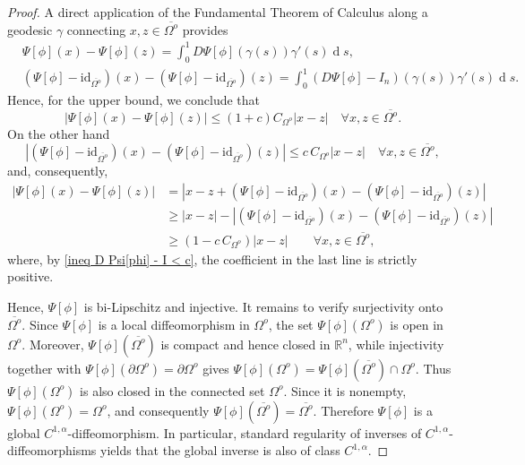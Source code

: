 \documentclass[11pt,reqno,a4paper]{amsart}
\theoremstyle{plain}
\theoremstyle{definition}
\newcommand{\R}{\mathbb{R}}
\renewcommand{\d}[1]{\ensuremath{\operatorname{d}\!{#1}}}
\begin{document}
\begin{proof}
    A direct application of the Fundamental Theorem of Calculus along a geodesic $\gamma$ connecting $x,z \in \overline{\Omega^o}$ provides
    \begin{equation*}
    \begin{aligned}
      &\Psi[\phi](x)-\Psi[\phi](z) = \int_{0}^{1} D \Psi[\phi](\gamma(s)) \gamma'(s) \d s ,
      \\
      &\left( \Psi[\phi] - \mathrm{id}_{\overline{\Omega^o}} \right)(x) - \left( \Psi[\phi] - \mathrm{id}_{\overline{\Omega^o}} \right)(z)  = \int_{0}^{1} \left( D \Psi[\phi]- I_n \right)(\gamma(s)) \gamma'(s) \d s .
    \end{aligned}
    \end{equation*}
    Hence, for the upper bound, we conclude that 
    \begin{equation*}
        |\Psi[\phi](x)-\Psi[\phi](z)|\leq (1+c) C_{\Omega^o} |x-z| \quad \forall x,z\in\overline{\Omega^o}.
    \end{equation*}
    On the other hand
    \begin{equation*}
        \left| \left( \Psi[\phi] - \mathrm{id}_{\overline{\Omega^o}} \right)(x) - \left( \Psi[\phi] - \mathrm{id}_{\overline{\Omega^o}} \right)(z) \right| \leq c \, C_{\Omega^o} |x-z| \quad \forall x,z\in\overline{\Omega^o},
    \end{equation*}
    and, consequently,
    \begin{equation*}
    \begin{aligned}
        |\Psi[\phi](x)-\Psi[\phi](z)| &= \left| x-z + \left( \Psi[\phi] - \mathrm{id}_{\overline{\Omega^o}} \right)(x) - \left( \Psi[\phi] - \mathrm{id}_{\overline{\Omega^o}} \right)(z) \right|
        \\
        &\geq
        |x-z| - \left| \left( \Psi[\phi] - \mathrm{id}_{\overline{\Omega^o}} \right)(x) - \left( \Psi[\phi] - \mathrm{id}_{\overline{\Omega^o}} \right)(z) \right|
        \\
        &\geq 
        \left( 1 - c  \, C_{\Omega^o} \right) |x-z| \qquad \forall x,z\in\overline{\Omega^o},
    \end{aligned}
    \end{equation*}
    where, by \eqref{ineq D Psi[phi] - I  < c}, the coefficient in the last line is strictly positive.
    
    Hence, $\Psi[\phi]$ is bi-Lipschitz and injective. It remains to verify surjectivity onto $\overline{\Omega^o}$. Since $\Psi[\phi]$ is a local diffeomorphism in $\Omega^o$, the set $\Psi[\phi](\Omega^o)$ is open in $\Omega^o$. Moreover, $\Psi[\phi](\overline{\Omega^o})$ is compact and hence closed in $\R^n$, while injectivity together with $\Psi[\phi](\partial\Omega^o)=\partial\Omega^o$ gives $\Psi[\phi](\Omega^o)=\Psi[\phi](\overline{\Omega^o})\cap\Omega^o$. Thus $\Psi[\phi](\Omega^o)$ is also closed in the connected set $\Omega^o$. Since it is nonempty, $\Psi[\phi](\Omega^o)=\Omega^o$, and consequently $\Psi[\phi](\overline{\Omega^o})=\overline{\Omega^o}$. Therefore $\Psi[\phi]$ is a global $C^{1,\alpha}$-diffeomorphism. In particular, standard regularity of inverses of $C^{1,\alpha}$-diffeomorphisms yields that the global inverse is also of class $C^{1,\alpha}$.
    

\end{proof}
\end{document}
